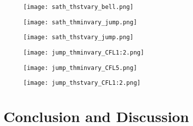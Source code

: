 \documentclass[12pt]{article}
\begin{document}
\begin{figure}[H]
    \centering
    \texttt{[image: sath\_thstvary\_bell.png]}
    \caption{}
\end{figure}

\begin{figure}[H]
    \centering
    \texttt{[image: sath\_thminvary\_jump.png]}
    \caption{}
\end{figure}

\begin{figure}[H]
    \centering
    \texttt{[image: sath\_thstvary\_jump.png]}
    \caption{}
\end{figure}


\begin{figure}[H]
    \centering
    \texttt{[image: jump\_thminvary\_CFL1:2.png]}
    \caption{}
\end{figure}

\begin{figure}[H]
    \centering
    \texttt{[image: jump\_thminvary\_CFL5.png]}
    \caption{}
\end{figure}

\begin{figure}[H]
    \centering
    \texttt{[image: jump\_thstvary\_CFL1:2.png]}
    \caption{}
\end{figure}

\section{Conclusion and Discussion}
\end{document}
